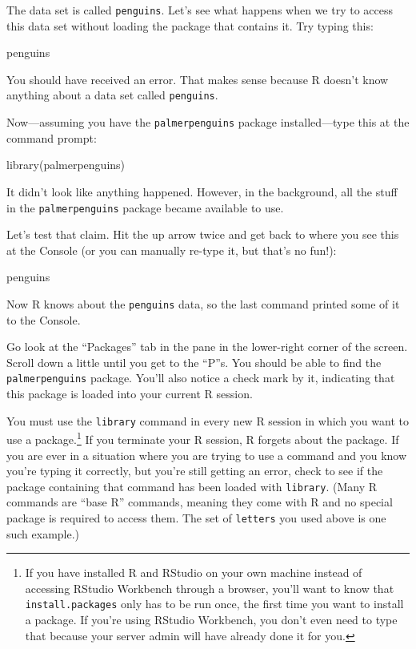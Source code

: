 \documentclass[
]{book}
\newenvironment{Shaded}{\begin{snugshade}}{\end{snugshade}}
\newcommand{\FunctionTok}[1]{\textcolor[rgb]{0.00,0.00,0.00}{#1}}
\newcommand{\NormalTok}[1]{#1}
\begin{document}
The data set is called \texttt{penguins}. Let's see what happens when we try to access this data set without loading the package that contains it. Try typing this:

\begin{Shaded}
\begin{Highlighting}[]
\NormalTok{penguins}
\end{Highlighting}
\end{Shaded}

You should have received an error. That makes sense because R doesn't know anything about a data set called \texttt{penguins}.

Now---assuming you have the \texttt{palmerpenguins} package installed---type this at the command prompt:

\begin{Shaded}
\begin{Highlighting}[]
\FunctionTok{library}\NormalTok{(palmerpenguins)}
\end{Highlighting}
\end{Shaded}

It didn't look like anything happened. However, in the background, all the stuff in the \texttt{palmerpenguins} package became available to use.

Let's test that claim. Hit the up arrow twice and get back to where you see this at the Console (or you can manually re-type it, but that's no fun!):

\begin{Shaded}
\begin{Highlighting}[]
\NormalTok{penguins}
\end{Highlighting}
\end{Shaded}

Now R knows about the \texttt{penguins} data, so the last command printed some of it to the Console.

Go look at the ``Packages'' tab in the pane in the lower-right corner of the screen. Scroll down a little until you get to the ``P''s. You should be able to find the \texttt{palmerpenguins} package. You'll also notice a check mark by it, indicating that this package is loaded into your current R session.

You must use the \texttt{library} command in every new R session in which you want to use a package.\footnote{If you have installed R and RStudio on your own machine instead of accessing RStudio Workbench through a browser, you'll want to know that \texttt{install.packages} only has to be run once, the first time you want to install a package. If you're using RStudio Workbench, you don't even need to type that because your server admin will have already done it for you.} If you terminate your R session, R forgets about the package. If you are ever in a situation where you are trying to use a command and you know you're typing it correctly, but you're still getting an error, check to see if the package containing that command has been loaded with \texttt{library}. (Many R commands are ``base R'' commands, meaning they come with R and no special package is required to access them. The set of \texttt{letters} you used above is one such example.)
\end{document}
